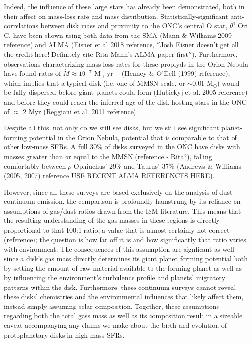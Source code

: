 Indeed, the influence of these large stars has already been demonstrated, both in their affect on mass-loss rate and mass distribution. Statistically-significant anti-correlations between disk mass and proximity to the ONC's central O star, $\theta^1$ Ori C, have been shown using both data from the SMA (Mann \& Williams 2009 reference) and ALMA (Eisner et al 2018 reference, $''$Josh Eisner doesn’t get all the credit here!  Definitely cite Rita Mann’s ALMA paper first $''$). Furthermore, observations characterizing mass-loss rates for these proplyds in the Orion Nebula have found rates of $\dot{M} \approx 10^{-7}$ M$_{\odot}$ yr$^{-1}$ (Henney \& O'Dell (1999) reference), which implies that a typical disk (i.e. one of MMSN-scale, or $\sim0.01$ M$_{\odot}$) would be fully dispersed before giant planets could form (Hubickyj et al. 2005 reference) and before they could reach the inferred age of the disk-hosting stars in the ONC of $\approx$ 2 Myr (Reggiani et al. 2011 reference).

  
Despite all this, not only do we still see disks, but we still see significant planet-forming potential in the Orion Nebula, potential that is comparable to that of other low-mass SFRs. A full 30\% of disks surveyed in the ONC have disks with masses greater than or equal to the MMSN (reference - Rita?), falling comfortably between $\rho$ Ophiuchus' 29\% and Taurus' 37\% (Andrews \& Williams (2005, 2007) reference USE RECENT ALMA REFERENCES HERE).



However, since all these surveys are based exclusively on the analysis of dust continuum emission, the comparison is profoundly hamstrung by its reliance on assumptions of gas/dust ratios drawn from the ISM literature. This means that the resulting understanding of the gas masses in these regions is directly proportional to that 100:1 ratio, a value that is almost certainly not correct (reference); the question is how far off it is and how significantly that ratio varies with environment. The consequences of this assumption are signficant as well, since a disk's gas mass directly determines its giant planet forming potential both by setting the amount of raw material available to the forming planet as well as by influencing the environment's turbulence profile and planets' migratory patterns within the disk. Furthermore, these continuum surveys cannot reveal these disks' chemistries and the environmental influences that likely affect them, instead simply assuming solar composition. Together, these assumptions regarding both the total gass mass as well as its composition result in a sizeable caveat accompanying any claims we make about the birth and evolution of protoplanetary disks in high-mass SFRs.


